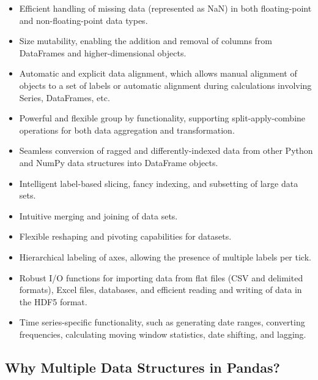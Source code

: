\begin{itemize}
	
	\item Efficient handling of missing data (represented as NaN) in both floating-point and non-floating-point data types.
	
	\item Size mutability, enabling the addition and removal of columns from DataFrames and higher-dimensional objects.
		
	\item Automatic and explicit data alignment, which allows manual alignment of objects to a set of labels or automatic alignment during calculations involving Series, DataFrames, etc.
	
	\item Powerful and flexible group by functionality, supporting split-apply-combine operations for both data aggregation and transformation.
	
	\item Seamless conversion of ragged and differently-indexed data from other Python and NumPy data structures into DataFrame objects.
	
	\item Intelligent label-based slicing, fancy indexing, and subsetting of large data sets.
	
	\item Intuitive merging and joining of data sets.
	
	\item Flexible reshaping and pivoting capabilities for datasets.
	
	\item Hierarchical labeling of axes, allowing the presence of multiple labels per tick.
	
	\item Robust I/O functions for importing data from flat files (CSV and delimited formats), Excel files, databases, and efficient reading and writing of data in the HDF5 format.
	
	\item Time series-specific functionality, such as generating date ranges, converting frequencies, calculating moving window statistics, date shifting, and lagging.
	
\end{itemize}

\subsection{Why Multiple Data Structures in Pandas?}


